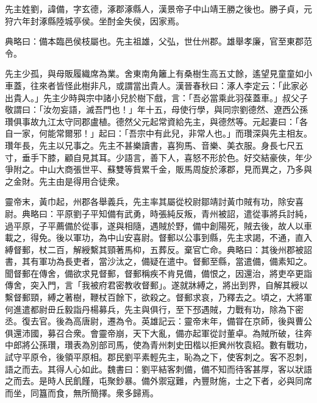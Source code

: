 
\begin{pinyinscope}
先主姓劉，諱備，字玄德，涿郡涿縣人，漢景帝子中山靖王勝之後也。勝子貞，元狩六年封涿縣陸城亭侯。坐酎金失侯，因家焉。

典略曰：備本臨邑侯枝屬也。先主祖雄，父弘，世仕州郡。雄舉孝廉，官至東郡范令。

先主少孤，與母販履織席為業。舍東南角籬上有桑樹生高五丈餘，遙望見童童如小車蓋，往來者皆怪此樹非凡，或謂當出貴人。漢晉春秋曰：涿人李定云：「此家必出貴人。」先主少時與宗中諸小兒於樹下戲，言：「吾必當乘此羽葆蓋車。」叔父子敬謂曰：「汝勿妄語，滅吾門也！」年十五，母使行學，與同宗劉德然、遼西公孫瓚俱事故九江太守同郡盧植。德然父元起常資給先主，與德然等。元起妻曰：「各自一家，何能常爾邪！」起曰：「吾宗中有此兒，非常人也。」而瓚深與先主相友。瓚年長，先主以兄事之。先主不甚樂讀書，喜狗馬、音樂、美衣服。身長七尺五寸，垂手下膝，顧自見其耳。少語言，善下人，喜怒不形於色。好交結豪俠，年少爭附之。中山大商張世平、蘇雙等貲累千金，販馬周旋於涿郡，見而異之，乃多與之金財。先主由是得用合徒衆。

靈帝末，黃巾起，州郡各舉義兵，先主率其屬從校尉鄒靖討黃巾賊有功，除安喜尉。典略曰：平原劉子平知備有武勇，時張純反叛，青州被詔，遣從事將兵討純，過平原，子平薦備於從事，遂與相隨，遇賊於野，備中創陽死，賊去後，故人以車載之，得免。後以軍功，為中山安喜尉。督郵以公事到縣，先主求謁，不通，直入縛督郵，杖二百，解綬繫其頸著馬枊，五葬反。棄官亡命。典略曰：其後州郡被詔書，其有軍功為長吏者，當沙汰之，備疑在遣中。督郵至縣，當遣備，備素知之。聞督郵在傳舍，備欲求見督郵，督郵稱疾不肯見備，備恨之，因還治，將吏卒更詣傳舍，突入門，言「我被府君密教收督郵」。遂就牀縛之，將出到界，自解其綬以繫督郵頸，縛之著樹，鞭杖百餘下，欲殺之。督郵求哀，乃釋去之。頃之，大將軍何進遣都尉毌丘毅詣丹楊募兵，先主與俱行，至下邳遇賊，力戰有功，除為下密丞。復去官。後為高唐尉，遷為令。英雄記云：靈帝末年，備甞在京師，後與曹公俱還沛國，募召合衆。會靈帝崩，天下大亂，備亦起軍從討董卓。為賊所破，往奔中郎將公孫瓚，瓚表為別部司馬，使為青州刺史田楷以拒兾州牧袁紹。數有戰功，試守平原令，後領平原相。郡民劉平素輕先主，恥為之下，使客刺之。客不忍刺，語之而去。其得人心如此。魏書曰：劉平結客刺備，備不知而待客甚厚，客以狀語之而去。是時人民飢饉，屯聚鈔暴。備外禦寇難，內豐財施，士之下者，必與同席而坐，同簋而食，無所簡擇。衆多歸焉。


\end{pinyinscope}
